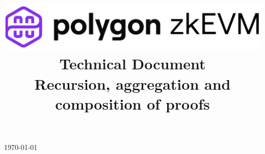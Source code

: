 \documentclass[preprint]{iacrtrans}
\title{
	\includegraphics[width=\columnwidth]{logo_zkEVM.png} \\ \vspace{0.3cm}
  Technical Document\\ \vspace{0.3cm}	
	Recursion, aggregation and composition of proofs \\
  \version
}
\institute{}
\theoremstyle{definition}
\begin{document}
\begin{titlepage}
\centering
\maketitle
\today
\end{titlepage}


{\hypersetup{linkcolor=.}\tableofcontents}

\newpage









\newpage



\newpage
\appendix
\end{document}
